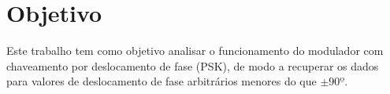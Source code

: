 \newpage
\section{Objetivo}
Este trabalho tem como objetivo analisar o funcionamento do modulador com chaveamento por deslocamento de fase (PSK), de modo a recuperar os dados para valores de deslocamento de fase arbitrários menores do que $\pm 90º$.